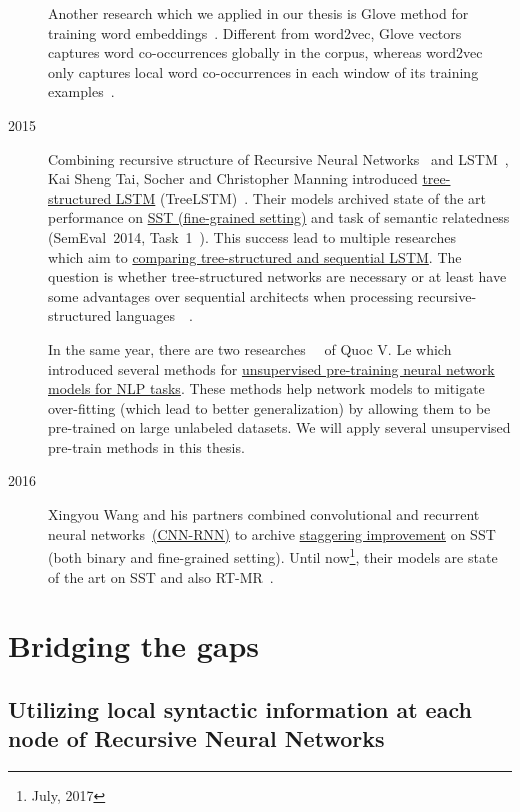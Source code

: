 \begin{description}
Another research which we applied in our thesis is Glove method for training word embeddings~\cite{glove}.
Different from word2vec, Glove vectors captures word co-occurrences globally in the corpus, whereas word2vec only captures local word co-occurrences in each window of its training examples~\cite{glove}.

\item [2015] Combining recursive structure of Recursive Neural Networks~\cite{socher2013recursive} and LSTM~\cite{originLSTM}, Kai Sheng Tai, Socher and Christopher Manning introduced \hyperref[sec:treelstm]{tree-structured LSTM}  (TreeLSTM)~\cite{treeLSTM}.
Their models archived state of the art performance on \hyperref[sec:sst]{SST (fine-grained setting)} and task of semantic relatedness (SemEval~2014, Task~1~\cite{SemeEvalTask1}).
This success lead to multiple researches~\cite{need-tree}~\cite{bowman-treevslstm}~\cite{Graves_Nature2016} which aim to \hyperref[treelstm-advantage]{comparing tree-structured and sequential LSTM}.
The question is whether tree-structured networks are necessary or at least have some advantages over sequential architects when processing recursive-structured languages~\cite{need-tree}~\cite{bowman-treevslstm}.

In the same year, there are two researches~\cite{ParagraphVec}~\cite{semisup-seq2seq} of Quoc V. Le which introduced several methods for \hyperref[sec:unsupervised-pretrain]{unsupervised pre-training neural network models for NLP tasks}.
These methods help network models to mitigate over-fitting (which lead to better generalization) by allowing them to be pre-trained on large unlabeled datasets.
We will apply several unsupervised pre-train methods in this thesis.

\item [2016] Xingyou Wang and his partners combined convolutional and recurrent neural networks~\hyperref[cnn-rnn]{(CNN-RNN)} to archive \hyperref[table:cnn-rnn]{staggering improvement} on SST (both binary and fine-grained setting).
Until now\footnote{July, 2017}, their models are state of the art on SST and also RT-MR~\cite{cnn-rnn}.
\end{description}

\section{Bridging the gaps}
\subsection{Utilizing local syntactic information at each node of Recursive Neural Networks}
